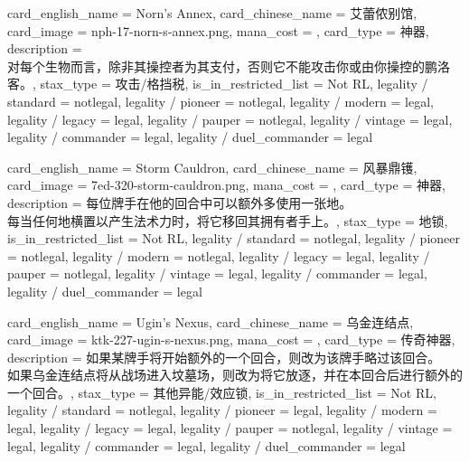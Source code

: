 \documentclass[lang = cn, color = black, 10pt]{AllThatStax}
\begin{document}
\card
{
	card_english_name = {Norn's Annex},
	card_chinese_name = {艾蕾侬别馆},
	card_image = nph-17-norn-s-annex.png,
	mana_cost = ,
	card_type = 神器,
	description = {\\
对每个生物而言，除非其操控者为其支付，否则它不能攻击你或由你操控的鹏洛客。},
	stax_type = 攻击/格挡税,
	is_in_restricted_list = Not RL,
	legality / standard = notlegal,
	legality / pioneer = notlegal,
	legality / modern = legal,
	legality / legacy = legal,
	legality / pauper = notlegal,
	legality / vintage = legal,
	legality / commander = legal,
	legality / duel_commander = legal
}

\card
{
	card_english_name = {Storm Cauldron},
	card_chinese_name = {风暴鼎镬},
	card_image = 7ed-320-storm-cauldron.png,
	mana_cost = ,
	card_type = 神器,
	description = {每位牌手在他的回合中可以额外多使用一张地。\\
每当任何地横置以产生法术力时，将它移回其拥有者手上。},
	stax_type = 地锁,
	is_in_restricted_list = Not RL,
	legality / standard = notlegal,
	legality / pioneer = notlegal,
	legality / modern = notlegal,
	legality / legacy = legal,
	legality / pauper = notlegal,
	legality / vintage = legal,
	legality / commander = legal,
	legality / duel_commander = legal
}

\card
{
	card_english_name = {Ugin's Nexus},
	card_chinese_name = {乌金连结点},
	card_image = ktk-227-ugin-s-nexus.png,
	mana_cost = ,
	card_type = 传奇神器,
	description = {如果某牌手将开始额外的一个回合，则改为该牌手略过该回合。\\
如果乌金连结点将从战场进入坟墓场，则改为将它放逐，并在本回合后进行额外的一个回合。},
	stax_type = 其他异能/效应锁,
	is_in_restricted_list = Not RL,
	legality / standard = notlegal,
	legality / pioneer = legal,
	legality / modern = legal,
	legality / legacy = legal,
	legality / pauper = notlegal,
	legality / vintage = legal,
	legality / commander = legal,
	legality / duel_commander = legal
}
\end{document}
